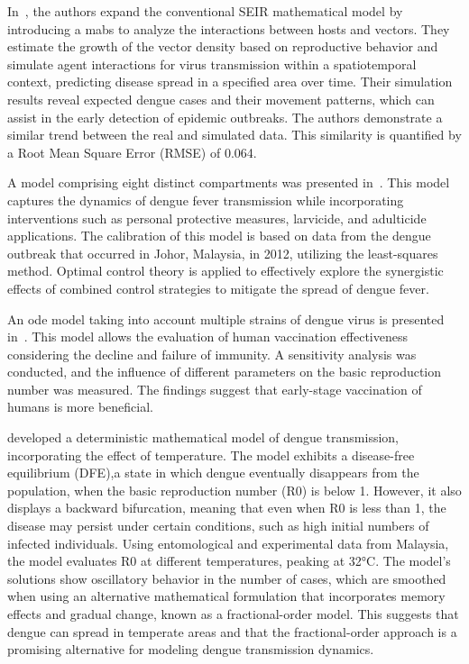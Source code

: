 In~\cite{Imran2020}, the authors expand the conventional SEIR mathematical model
by introducing a \gls{mabs} to analyze the interactions between hosts and
vectors. They estimate the growth of the vector density based on reproductive
behavior and simulate agent interactions for virus transmission within a
spatiotemporal context, predicting disease spread in a specified area over time.
Their simulation results reveal expected dengue cases and their movement
patterns, which can assist in the early detection of epidemic outbreaks. The
authors demonstrate a similar trend between the real and simulated data. This
similarity is quantified by a Root Mean Square Error (RMSE) of 0.064.

A model comprising eight distinct compartments was presented
in~\cite{Abidemi2020}. This model captures the dynamics of dengue fever
transmission while incorporating interventions such as personal protective
measures, larvicide, and adulticide applications. The calibration of this model
is based on data from the dengue outbreak that occurred in Johor, Malaysia, in
2012, utilizing the least-squares method. Optimal control theory is applied to
effectively explore the synergistic effects of combined control strategies to
mitigate the spread of dengue fever.

An \gls{ode} model taking into account multiple strains of dengue virus is
presented in~\cite{Xue2021}. This model allows the evaluation of human
vaccination effectiveness considering the decline and failure of immunity. A
sensitivity analysis was conducted, and the influence of different parameters on
the basic reproduction number was measured. The findings suggest that
early-stage vaccination of humans is more beneficial.

\cite{hamdan:2021} developed a deterministic mathematical model of dengue
transmission, incorporating the effect of temperature. The model exhibits a
disease-free equilibrium (DFE),a state in which dengue eventually disappears
from the population, when the basic reproduction number (R0) is below 1.
However, it also displays a backward bifurcation, meaning that even when R0 is
less than 1, the disease may persist under certain conditions, such as high
initial numbers of infected individuals. Using entomological and experimental
data from Malaysia, the model evaluates R0 at different temperatures, peaking at
32°C. The model's solutions show oscillatory behavior in the number of cases,
which are smoothed when using an alternative mathematical formulation that
incorporates memory effects and gradual change, known as a fractional-order
model. This suggests that dengue can spread in temperate areas and that the
fractional-order approach is a promising alternative for modeling dengue
transmission dynamics.


